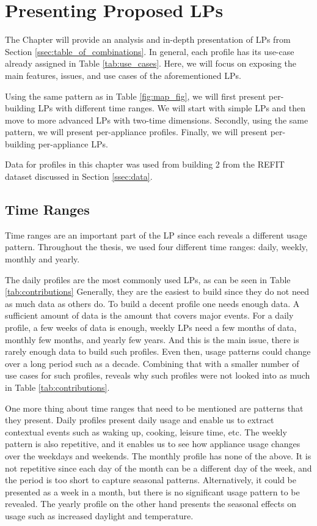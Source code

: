 \chapter{Presenting Proposed LPs}
\label{chapter4}

The Chapter will provide an analysis and in-depth presentation of LPs from Section \ref{ssec:table_of_combinations}.
In general, each profile has its use-case already assigned in Table \ref{tab:use_cases}.
Here, we will focus on exposing the main features, issues, and use cases of the aforementioned LPs. 

Using the same pattern as in Table \ref{fig:map_fig}, we will first present per-building LPs with different time ranges.
We will start with simple LPs and then move to more advanced LPs with two-time dimensions.
Secondly, using the same pattern, we will present per-appliance profiles.
Finally, we will present per-building per-appliance LPs.

Data for profiles in this chapter was used from building 2 from the REFIT dataset discussed in Section \ref{ssec:data}.
 
\section{Time Ranges}
\label{sec:time_range}

Time ranges are an important part of the LP since each reveals a different usage pattern.
Throughout the thesis, we used four different time ranges: daily, weekly, monthly and yearly.

The daily profiles are the most commonly used LPs, as can be seen in Table \ref{tab:contributions}
Generally, they are the easiest to build since they do not need as much data as others do.
To build a decent profile one needs enough data. 
A sufficient amount of data is the amount that covers major events.
For a daily profile, a few weeks of data is enough, weekly LPs need a few months of data, monthly few months, and yearly few years.
And this is the main issue, there is rarely enough data to build such profiles.
Even then, usage patterns could change over a long period such as a decade.
Combining that with a smaller number of use cases for such profiles, reveals why such profiles were not looked into as much in Table \ref{tab:contributions}.

One more thing about time ranges that need to be mentioned are patterns that they present.
Daily profiles present daily usage and enable us to extract contextual events such as waking up, cooking, leisure time, etc.
The weekly pattern is also repetitive, and it enables us to see how appliance usage changes over the weekdays and weekends.
The monthly profile has none of the above. It is not repetitive since each day of the month can be a different day of the week, and the period is too short to capture seasonal patterns.
Alternatively, it could be presented as a week in a month, but there is no significant usage pattern to be revealed.
The yearly profile on the other hand presents the seasonal effects on usage such as increased daylight and temperature. 

